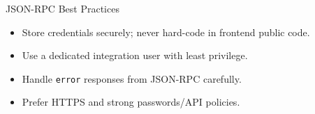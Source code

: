 \begin{frame}{JSON-RPC Best Practices}
	\begin{itemize}
		\item Store credentials securely; never hard-code in frontend public code.
		\item Use a dedicated integration user with least privilege.
		\item Handle \texttt{error} responses from JSON-RPC carefully.
		\item Prefer HTTPS and strong passwords/API policies.
	\end{itemize}
\end{frame}
